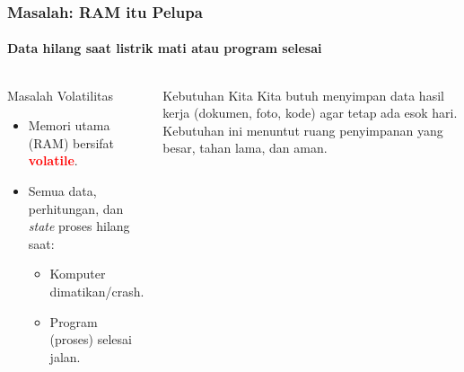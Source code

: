 \documentclass[t,aspectratio=169,xcolor=dvipsnames]{beamer}
\newcommand{\tem}[1]{\textbf{\textcolor{red}{#1}}}
\begin{document}
\begin{frame}[shrink=5]
    \frametitle{Masalah: RAM itu Pelupa}
    \framesubtitle{Data hilang saat listrik mati atau program selesai}

    \begin{columns}[T]
        \begin{alertblock}{Masalah Volatilitas}
            \begin{itemize}
                \item Memori utama (RAM) bersifat \tem{volatile}.
                \item Semua data, perhitungan, dan \textit{state} proses hilang saat:
                \begin{itemize}
                    \item Komputer dimatikan/crash.
                    \item Program (proses) selesai jalan.
                \end{itemize}
            \end{itemize}
        \end{alertblock}

        \begin{exampleblock}{Kebutuhan Kita}
            Kita butuh menyimpan data hasil kerja (dokumen, foto, kode) agar tetap ada esok hari.
            Kebutuhan ini menuntut ruang penyimpanan yang besar, tahan lama, dan aman.
        \end{exampleblock}
    \end{columns}
\end{frame}
\end{document}
